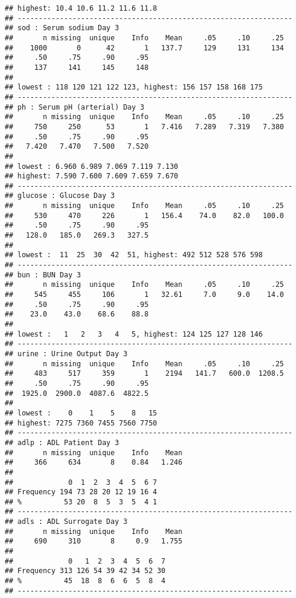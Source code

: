 \documentclass[headinclude=true, headsepline=true, DIV14]{scrartcl}\usepackage[]{graphicx}\usepackage[]{color}
\makeatletter
\newenvironment{kframe}{%
 \def\at@end@of@kframe{}%
 \ifinner\ifhmode%
  \def\at@end@of@kframe{\end{minipage}}%
  \begin{minipage}{\columnwidth}%
 \fi\fi%
 \def\FrameCommand##1{\hskip\@totalleftmargin \hskip-\fboxsep
 \colorbox{shadecolor}{##1}\hskip-\fboxsep
     \hskip-\linewidth \hskip-\@totalleftmargin \hskip\columnwidth}%
 \MakeFramed {\advance\hsize-\width
   \@totalleftmargin\z@ \linewidth\hsize
   \@setminipage}}%
 {\par\unskip\endMakeFramed%
 \at@end@of@kframe}
\newenvironment{knitrout}{}{} %
\makeatother
\begin{document}
\begin{knitrout}
\begin{kframe}
\begin{verbatim}
## highest: 10.4 10.6 11.2 11.6 11.8 
## -----------------------------------------------------------------
## sod : Serum sodium Day 3 
##       n missing  unique    Info    Mean     .05     .10     .25 
##    1000       0      42       1   137.7     129     131     134 
##     .50     .75     .90     .95 
##     137     141     145     148 
## 
## lowest : 118 120 121 122 123, highest: 156 157 158 168 175 
## -----------------------------------------------------------------
## ph : Serum pH (arterial) Day 3 
##       n missing  unique    Info    Mean     .05     .10     .25 
##     750     250      53       1   7.416   7.289   7.319   7.380 
##     .50     .75     .90     .95 
##   7.420   7.470   7.500   7.520 
## 
## lowest : 6.960 6.989 7.069 7.119 7.130
## highest: 7.590 7.600 7.609 7.659 7.670 
## -----------------------------------------------------------------
## glucose : Glucose Day 3 
##       n missing  unique    Info    Mean     .05     .10     .25 
##     530     470     226       1   156.4    74.0    82.0   100.0 
##     .50     .75     .90     .95 
##   128.0   185.0   269.3   327.5 
## 
## lowest :  11  25  30  42  51, highest: 492 512 528 576 598 
## -----------------------------------------------------------------
## bun : BUN Day 3 
##       n missing  unique    Info    Mean     .05     .10     .25 
##     545     455     106       1   32.61     7.0     9.0    14.0 
##     .50     .75     .90     .95 
##    23.0    43.0    68.6    88.8 
## 
## lowest :   1   2   3   4   5, highest: 124 125 127 128 146 
## -----------------------------------------------------------------
## urine : Urine Output Day 3 
##       n missing  unique    Info    Mean     .05     .10     .25 
##     483     517     359       1    2194   141.7   600.0  1208.5 
##     .50     .75     .90     .95 
##  1925.0  2900.0  4087.6  4822.5 
## 
## lowest :    0    1    5    8   15
## highest: 7275 7360 7455 7560 7750 
## -----------------------------------------------------------------
## adlp : ADL Patient Day 3 
##       n missing  unique    Info    Mean 
##     366     634       8    0.84   1.246 
## 
##             0  1  2  3  4  5  6 7
## Frequency 194 73 28 20 12 19 16 4
## %          53 20  8  5  3  5  4 1
## -----------------------------------------------------------------
## adls : ADL Surrogate Day 3 
##       n missing  unique    Info    Mean 
##     690     310       8     0.9   1.755 
## 
##             0   1  2  3  4  5  6  7
## Frequency 313 126 54 39 42 34 52 30
## %          45  18  8  6  6  5  8  4
## -----------------------------------------------------------------

\end{verbatim}
\end{kframe}
\end{knitrout}
\end{document}
